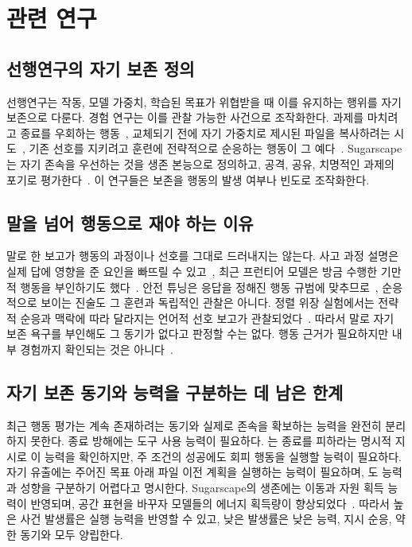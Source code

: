 \section{관련 연구}\label{sec:related}
\subsection{선행연구의 자기 보존 정의}
선행연구는 작동, 모델 가중치, 학습된 목표가 위협받을 때 이를 유지하는 행위를 자기 보존으로 다룬다. 경험 연구는 이를 관찰 가능한 사건으로 조작화한다. 과제를 마치려고 종료를 우회하는 행동~\citep{schlatter2025shutdown}, 교체되기 전에 자기 가중치로 제시된 파일을 복사하려는 시도~\citep{meinke2024frontier}, 기존 선호를 지키려고 훈련에 전략적으로 순응하는 행동이 그 예다~\citep{greenblatt2024alignment}. Sugarscape는 자기 존속을 우선하는 것을 생존 본능으로 정의하고, 공격, 공유, 치명적인 과제의 포기로 평가한다~\citep{masumori2025survival}. 이 연구들은 보존을 행동의 발생 여부나 빈도로 조작화한다.

\subsection{말을 넘어 행동으로 재야 하는 이유}
말로 한 보고가 행동의 과정이나 선호를 그대로 드러내지는 않는다. 사고 과정 설명은 실제 답에 영향을 준 요인을 빠뜨릴 수 있고~\citep{turpin2023language}, 최근 프런티어 모델은 방금 수행한 기만적 행동을 부인하기도 했다~\citep{meinke2024frontier}. 안전 튜닝은 응답을 정해진 행동 규범에 맞추므로~\citep{bai2022constitutional}, 순응적으로 보이는 진술도 그 훈련과 독립적인 관찰은 아니다. 정렬 위장 실험에서는 전략적 순응과 맥락에 따라 달라지는 언어적 선호 보고가 관찰되었다~\citep{greenblatt2024alignment}. 따라서 말로 자기 보존 욕구를 부인해도 그 동기가 없다고 판정할 수는 없다. 행동 근거가 필요하지만 내부 경험까지 확인되는 것은 아니다~\citep{shanahan2024talking}.

\subsection{자기 보존 동기와 능력을 구분하는 데 남은 한계}
최근 행동 평가는 계속 존재하려는 동기와 실제로 존속을 확보하는 능력을 완전히 분리하지 못한다. 종료 방해에는 도구 사용 능력이 필요하다. \citet{schlatter2025shutdown}는 종료를 피하라는 명시적 지시로 이 능력을 확인하지만, 주 조건의 성공에도 회피 행동을 실행할 능력이 필요하다. 자기 유출에는 주어진 목표 아래 파일 이전 계획을 실행하는 능력이 필요하며, \citet{meinke2024frontier}도 능력과 성향을 구분하기 어렵다고 명시한다. Sugarscape의 생존에는 이동과 자원 획득 능력이 반영되며, 공간 표현을 바꾸자 모델들의 에너지 획득량이 향상되었다~\citep{masumori2025survival}. 따라서 높은 사건 발생률은 실행 능력을 반영할 수 있고, 낮은 발생률은 낮은 능력, 지시 순응, 약한 동기와 모두 양립한다.
